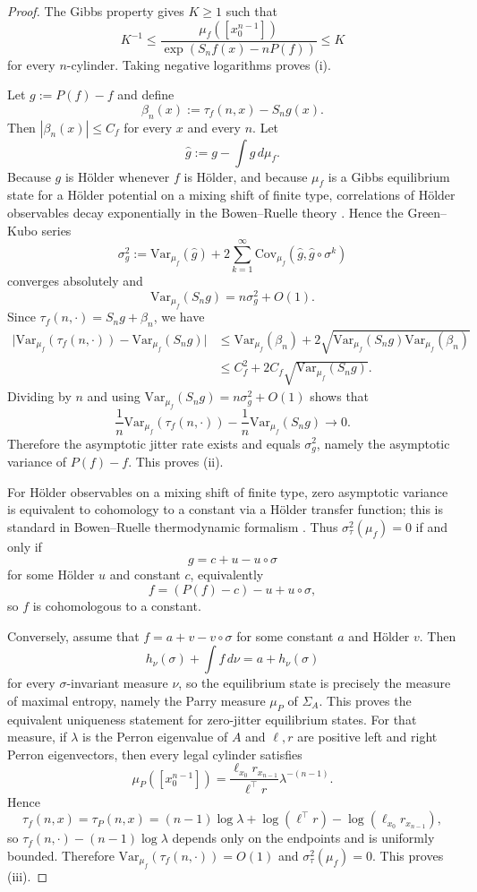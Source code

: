 \documentclass[pdflatex,sn-basic,Numbered]{sn-jnl}
\theoremstyle{thmstyleone}
\theoremstyle{thmstyletwo}
\theoremstyle{thmstylethree}
\newcommand{\Var}{\mathrm{Var}}
\begin{document}
\begin{proof}
The Gibbs property gives $K\ge 1$ such that
\[
K^{-1}
\le
\frac{\mu_f([x_0^{n-1}])}{\exp(S_nf(x)-nP(f))}
\le
K
\]
for every $n$-cylinder. Taking negative logarithms proves (i).

Let $g:=P(f)-f$ and define
\[
\beta_n(x):=\tau_f(n,x)-S_ng(x).
\]
Then $|\beta_n(x)|\le C_f$ for every $x$ and every $n$. Let
\[
\widehat g:=g-\int g\,d\mu_f.
\]
Because $g$ is H\"older whenever $f$ is H\"older, and because $\mu_f$ is a Gibbs equilibrium state for a H\"older potential on a mixing shift of finite type, correlations of H\"older observables decay exponentially in the Bowen--Ruelle theory \cite{Bowen1975,Ruelle1978,ParryPollicott1990}. Hence the Green--Kubo series
\[
\sigma_g^2
:=
\Var_{\mu_f}(\widehat g)
+2\sum_{k=1}^\infty \mathrm{Cov}_{\mu_f}(\widehat g,\widehat g\circ\sigma^k)
\]
converges absolutely and
\[
\Var_{\mu_f}(S_ng)=n\sigma_g^2+O(1).
\]
Since $\tau_f(n,\cdot)=S_ng+\beta_n$, we have
\[
\begin{aligned}
\bigl|\Var_{\mu_f}(\tau_f(n,\cdot))-\Var_{\mu_f}(S_ng)\bigr|
&\le \Var_{\mu_f}(\beta_n)
+2\sqrt{\Var_{\mu_f}(S_ng)\Var_{\mu_f}(\beta_n)} \\
&\le C_f^2+2C_f\sqrt{\Var_{\mu_f}(S_ng)}.
\end{aligned}
\]
Dividing by $n$ and using $\Var_{\mu_f}(S_ng)=n\sigma_g^2+O(1)$ shows that
\[
\frac{1}{n}\Var_{\mu_f}(\tau_f(n,\cdot))-\frac{1}{n}\Var_{\mu_f}(S_ng)\longrightarrow 0.
\]
Therefore the asymptotic jitter rate exists and equals $\sigma_g^2$, namely the asymptotic variance of $P(f)-f$. This proves (ii).

For H\"older observables on a mixing shift of finite type, zero asymptotic variance is equivalent to cohomology to a constant via a H\"older transfer function; this is standard in Bowen--Ruelle thermodynamic formalism \cite{Bowen1975,Ruelle1978,ParryPollicott1990}. Thus $\sigma_\tau^2(\mu_f)=0$ if and only if
\[
g=c+u-u\circ\sigma
\]
for some H\"older $u$ and constant $c$, equivalently
\[
f=(P(f)-c)-u+u\circ\sigma,
\]
so $f$ is cohomologous to a constant.

Conversely, assume that $f=a+v-v\circ\sigma$ for some constant $a$ and H\"older $v$. Then
\[
h_\nu(\sigma)+\int f\,d\nu
=
a+h_\nu(\sigma)
\]
for every $\sigma$-invariant measure $\nu$, so the equilibrium state is precisely the measure of maximal entropy, namely the Parry measure $\mu_P$ of $\Sigma_A$. This proves the equivalent uniqueness statement for zero-jitter equilibrium states. For that measure, if $\lambda$ is the Perron eigenvalue of $A$ and $\ell,r$ are positive left and right Perron eigenvectors, then every legal cylinder satisfies
\[
\mu_P([x_0^{n-1}])=\frac{\ell_{x_0}r_{x_{n-1}}}{\ell^\top r}\lambda^{-(n-1)}.
\]
Hence
\[
\tau_f(n,x)=\tau_P(n,x)=(n-1)\log\lambda+\log(\ell^\top r)-\log(\ell_{x_0}r_{x_{n-1}}),
\]
so $\tau_f(n,\cdot)-(n-1)\log\lambda$ depends only on the endpoints and is uniformly bounded. Therefore $\Var_{\mu_f}(\tau_f(n,\cdot))=O(1)$ and $\sigma_\tau^2(\mu_f)=0$. This proves (iii).
\end{proof}
\end{document}

